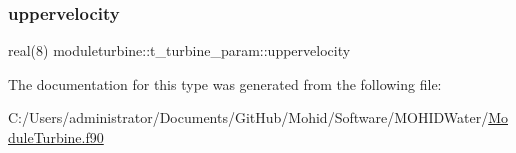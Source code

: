 \subsubsection{\texorpdfstring{uppervelocity}{uppervelocity}}
{\footnotesize\ttfamily real(8) moduleturbine\+::t\+\_\+turbine\+\_\+param\+::uppervelocity\hspace{0.3cm}{\ttfamily [private]}}



The documentation for this type was generated from the following file\+:\begin{DoxyCompactItemize}
\item 
C\+:/\+Users/administrator/\+Documents/\+Git\+Hub/\+Mohid/\+Software/\+M\+O\+H\+I\+D\+Water/\mbox{\hyperlink{_module_turbine_8f90}{Module\+Turbine.\+f90}}\end{DoxyCompactItemize}
